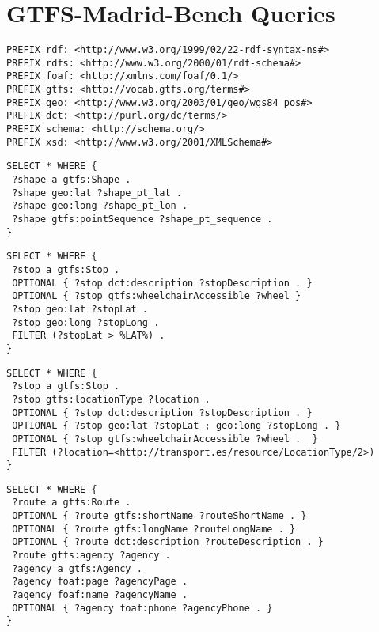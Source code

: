 \section{GTFS-Madrid-Bench Queries}
\label{sec:appendix1}

\begin{lstlisting}[caption=Prefixes, label=lst:prefixes, basicstyle=\small,frame=single]
PREFIX rdf: <http://www.w3.org/1999/02/22-rdf-syntax-ns#>
PREFIX rdfs: <http://www.w3.org/2000/01/rdf-schema#>
PREFIX foaf: <http://xmlns.com/foaf/0.1/>
PREFIX gtfs: <http://vocab.gtfs.org/terms#>
PREFIX geo: <http://www.w3.org/2003/01/geo/wgs84_pos#>
PREFIX dct: <http://purl.org/dc/terms/>
PREFIX schema: <http://schema.org/>
PREFIX xsd: <http://www.w3.org/2001/XMLSchema#>
\end{lstlisting}

\begin{lstlisting}[caption=Query 1 - List all shapes with some of their data, label=lst:sparql1, basicstyle=\small,frame=single]
SELECT * WHERE {
 ?shape a gtfs:Shape .
 ?shape geo:lat ?shape_pt_lat .
 ?shape geo:long ?shape_pt_lon .
 ?shape gtfs:pointSequence ?shape_pt_sequence .
}
\end{lstlisting}

\begin{lstlisting}[caption={Query 2 - List all stops with some of their data including geographic coordinates, where the latitude is bigger than its mean}, label=lst:sparql2, basicstyle=\small,frame=single]
SELECT * WHERE {
 ?stop a gtfs:Stop . 
 OPTIONAL { ?stop dct:description ?stopDescription . }
 OPTIONAL { ?stop gtfs:wheelchairAccessible ?wheel }
 ?stop geo:lat ?stopLat . 
 ?stop geo:long ?stopLong .
 FILTER (?stopLat > %LAT%) .		
}
\end{lstlisting}

\begin{lstlisting}[caption={Query 3 - Find the accessibility information for the stations, if available}, label=lst:sparql3, basicstyle=\small,frame=single]
SELECT * WHERE {
 ?stop a gtfs:Stop . 
 ?stop gtfs:locationType ?location .
 OPTIONAL { ?stop dct:description ?stopDescription . }
 OPTIONAL { ?stop geo:lat ?stopLat ; geo:long ?stopLong . }
 OPTIONAL { ?stop gtfs:wheelchairAccessible ?wheel .  }
 FILTER (?location=<http://transport.es/resource/LocationType/2>)
}
\end{lstlisting}

\begin{lstlisting}[caption=Query 4 - List all agencies and their routes with some of their data, label=lst:sparql4, basicstyle=\small,frame=single]
SELECT * WHERE {
 ?route a gtfs:Route .
 OPTIONAL { ?route gtfs:shortName ?routeShortName . }
 OPTIONAL { ?route gtfs:longName ?routeLongName . } 
 OPTIONAL { ?route dct:description ?routeDescription . } 
 ?route gtfs:agency ?agency .
 ?agency a gtfs:Agency .
 ?agency foaf:page ?agencyPage .
 ?agency foaf:name ?agencyName .
 OPTIONAL { ?agency foaf:phone ?agencyPhone . }
}
\end{lstlisting}

